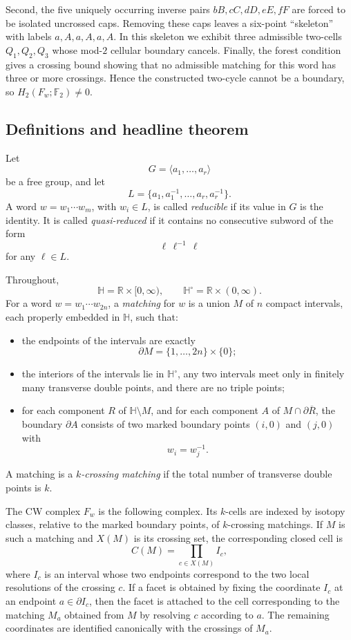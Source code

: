 \documentclass[12pt]{article}
\newcommand{\RR}{\mathbb{R}}
\newcommand{\HH}{\mathbb{H}}
\newcommand{\Ftwo}{\mathbb{F}_2}
\newcommand{\bd}{\partial}
\theoremstyle{definition}
\begin{document}
Second, the five uniquely occurring inverse pairs \(bB,cC,dD,eE,fF\) are forced to be isolated uncrossed caps.  Removing these caps leaves a six-point ``skeleton'' with labels \(a,A,a,A,a,A\).  In this skeleton we exhibit three admissible two-cells \(Q_1,Q_2,Q_3\) whose mod-\(2\) cellular boundary cancels.  Finally, the forest condition gives a crossing bound showing that no admissible matching for this word has three or more crossings.  Hence the constructed two-cycle cannot be a boundary, so \(H_2(F_w;\Ftwo)\neq 0\).

\subsection{Definitions and headline theorem}

Let
\[
G=\langle a_1,\dots,a_r\rangle
\]
be a free group, and let
\[
L=\{a_1,a_1^{-1},\dots,a_r,a_r^{-1}\}.
\]
A word \(w=w_1\cdots w_m\), with \(w_i\in L\), is called \emph{reducible} if its value in \(G\) is the identity.  It is called \emph{quasi-reduced} if it contains no consecutive subword of the form
\[
\ell\,\ell^{-1}\,\ell
\]
for any \(\ell\in L\).

Throughout,
\[
\HH=\RR\times[0,\infty),\qquad \HH^\circ=\RR\times(0,\infty).
\]
For a word \(w=w_1\cdots w_{2n}\), a \emph{matching} for \(w\) is a union \(M\) of \(n\) compact intervals, each properly embedded in \(\HH\), such that:
\begin{itemize}
\item the endpoints of the intervals are exactly
\[
\bd M=\{1,\dots,2n\}\times\{0\};
\]
\item the interiors of the intervals lie in \(\HH^\circ\), any two intervals meet only in finitely many transverse double points, and there are no triple points;
\item for each component \(R\) of \(\HH\setminus M\), and for each component \(A\) of \(M\cap\bd\overline{R}\), the boundary \(\bd A\) consists of two marked boundary points \((i,0)\) and \((j,0)\) with
\[
w_i=w_j^{-1}.
\]
\end{itemize}
A matching is a \emph{\(k\)-crossing matching} if the total number of transverse double points is \(k\).

The CW complex \(F_w\) is the following complex.  Its \(k\)-cells are indexed by isotopy classes, relative to the marked boundary points, of \(k\)-crossing matchings.  If \(M\) is such a matching and \(X(M)\) is its crossing set, the corresponding closed cell is
\[
C(M)=\prod_{c\in X(M)} I_c,
\]
where \(I_c\) is an interval whose two endpoints correspond to the two local resolutions of the crossing \(c\).  If a facet is obtained by fixing the coordinate \(I_c\) at an endpoint \(a\in\bd I_c\), then the facet is attached to the cell corresponding to the matching \(M_a\) obtained from \(M\) by resolving \(c\) according to \(a\).  The remaining coordinates are identified canonically with the crossings of \(M_a\).
\end{document}
